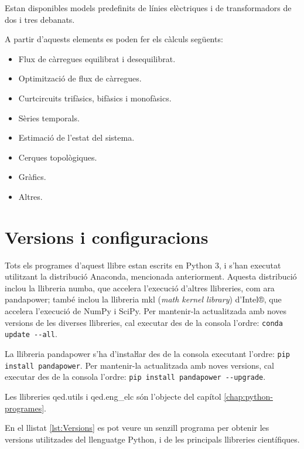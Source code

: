 Estan disponibles models predefinits de línies elèctriques i de transformadors de dos i tres debanats.

A partir d'aquests elements  es poden fer els càlculs següents:
\begin{itemize}
	\item Flux de càrregues equilibrat i desequilibrat.
	\item Optimització de flux de càrregues.
	\item Curtcircuits trifàsics, bifàsics i monofàsics.
	\item Sèries temporals.
	\item Estimació de l'estat del sistema.
	\item Cerques topològiques.
	\item Gràfics.
	\item Altres.
\end{itemize}


\section{Versions i configuracions}\label{sec:python-versions}

Tots els programes d'aquest llibre estan escrits en Python 3, i s'han executat utilitzant la distribució Anaconda, mencionada anteriorment. Aquesta distribució inclou la llibreria numba, que accelera l'execució d'altres llibreries, com ara pandapower; també inclou la llibreria mkl (\textit{math kernel library})  d'Intel®, que accelera l'execució de NumPy i SciPy. Per mantenir-la actualitzada amb noves versions de les diverses llibreries, cal executar des de la consola    l'ordre: \texttt{conda update  -{}-all}.


La llibreria pandapower s'ha d'instaŀlar des de la consola executant   l'ordre: \texttt{pip install pandapower}. Per mantenir-la actualitzada amb noves versions, cal executar des de la consola    l'ordre: \texttt{pip install pandapower -{}-upgrade}.

 Les llibreries qed.utils i qed.eng\_elc són l'objecte del capítol \ref{chap:python-programes}. 

En el llistat \vref{lst:Versions} es pot veure un senzill programa per obtenir les versions utilitzades  del llenguatge Python, i de les  principals llibreries científiques.


